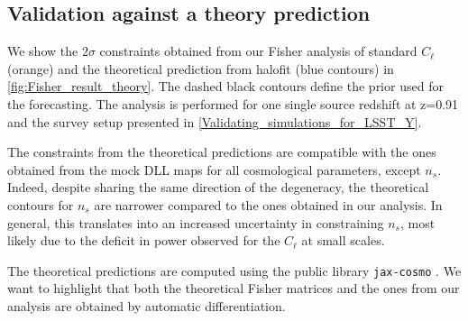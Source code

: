 \documentclass{aa}
\begin{document}
%
%
 
\begin{appendix}

\section{Validation against a theory prediction}
We show the $2\sigma$ constraints obtained from our Fisher analysis of standard $C_{\ell}$ (orange) and the theoretical prediction from halofit (blue contours) in \autoref{fig:Fisher_result_theory}. The dashed black contours define the prior used for the forecasting.
The analysis is performed for one single source redshift at z=0.91 and the survey setup presented in \autoref{Validating_simulations_for_LSST_Y}.

The constraints from the theoretical predictions
are compatible with the ones obtained from the mock DLL maps for all cosmological parameters, except $n_s$. Indeed, despite sharing the same direction of the degeneracy, the theoretical contours for $n_s$ are narrower compared to the ones obtained in our analysis. In general, this translates into an increased uncertainty in constraining $n_s$, most likely due to the deficit in power observed for the $C_{\ell}$ at small scales. 

The theoretical predictions are computed using the public library \texttt{jax-cosmo} \citep{Campagne_2023}. 
We want to highlight that both the theoretical Fisher matrices and the ones from our analysis are obtained by automatic differentiation.



\end{appendix}
\end{document}
